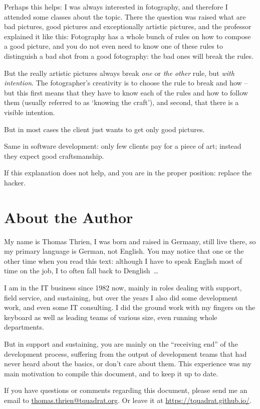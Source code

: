 \documentclass[11pt,a4paper, titlepage, parskip=half, headsepline, footsepline, cleardoublepage=current, headheight=1cm]{scrbook}
\begin{document}
Perhaps this helps: I was always interested in fotography, and therefore I attended some classes about the topic. There the question was raised what are bad pictures, good pictures and exceptionally artistic pictures, and the professor explained it like this: Fotography has a whole bunch of rules on how to compose a good picture, and you do not even need to know one of these rules to distinguish a bad shot from a good fotography: the bad ones will break the rules.

But the really artistic pictures always break \textit{one} or \textit{the other} rule, but \textit{with intention}. The fotographer's creativity is to choose the rule to break and how – but this first means that they have to know each of the rules and how to follow them (usually referred to as ‘knowing the craft’), and second, that there is a visible intention.

But in most cases the client just wants to get only good pictures.

Same in software development: only few clients pay for a piece of art; instead they expect good craftsmanship.

If this explanation does not help, and you are in the proper position: replace the hacker.

\section{About the Author}
My name is Thomas Thrien, I was born and raised in Germany, still live there, so my primary language is German, not English. You may notice that one or the other time when you read this text: although I have to speak English most of time on the job, I to often fall back to Denglish~…

I am in the IT business since 1982 now, mainly in roles dealing with support, field service, and sustaining, but over the years I also did some development work, and even some IT consulting. I did the ground work with my fingers on the keyboard as well as leading teams of various size, even running whole departments.

But in support and sustaining, you are mainly on the “receiving end” of the development process, suffering from the output of development teams that had never heard about the basics, or don't care about them. This experience was my main motivation to compile this document, and to keep it up to date.
 
If you have questions or comments regarding this document, please send me an email to \href{mailto:thomas.thrien@tquadrat.org}{thomas.thrien@tquadrat.org}. Or leave it at \url{https://tquadrat.github.io/}.
\end{document}
